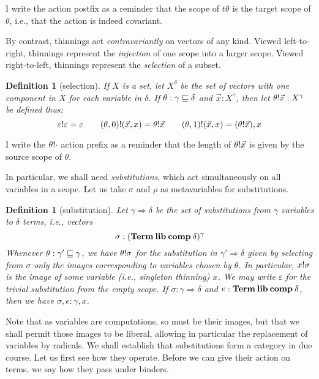 \documentclass{jfp1}
\newtheorem{definition}[theorem]{Definition}
\newcommand{\emp}{\varepsilon}
\begin{document}
I write the action postfix as a reminder that the scope of $t\theta$
is the target scope of $\theta$, i.e., that the action is indeed covariant.

By contrast, thinnings act \emph{contravariantly} on vectors of any kind.
Viewed left-to-right, thinnings represent the \emph{injection} of one scope
into a larger scope. Viewed right-to-left, thinnings represent the
\emph{selection} of a subset.

\begin{definition}[selection]
  If $X$ is a set, let $X^\delta$ be the set of vectors with one
  component in $X$ for each variable in $\delta$. If
  $\theta:\gamma\sqsubseteq\delta$ and $\vec x:X^\gamma$,
  then let $\theta!\vec x : X^\gamma$ be defined thus:
  \[
    \sel\emp\emp=\emp \qquad
    \sel{(\theta,0)}{(\vec x,x)} = \sel\theta{\vec x} \qquad
    \sel{(\theta,1)}{(\vec x,x)} = (\sel\theta{\vec x}),x
  \]
\end{definition}

I write the $\theta!\cdot$ action prefix as a reminder that the
length of $\theta!\vec x$ is given by the source scope
of $\theta$.

In particular, we shall need \emph{substitutions}, which act simultaneously on all variables
in a scope. Let us take $\sigma$ and $\rho$ as metavariables for substitutions.

\newcommand{\su}{\Rightarrow}
\begin{definition}[substitution]
  Let $\gamma\su\delta$ be the set of substitutions from $\gamma$ variables to $\delta$ terms,
  i.e., vectors \[\sigma : (\mathbf{Term}\:\textbf{lib}\:\textbf{comp}\:\delta)^\gamma\]
  Whenever $\theta : \gamma'\sqsubseteq\gamma$, we have $\theta!\sigma$
  for the substitution in $\gamma'\su\delta$ given by selecting from
  $\sigma$ only the images corresponding to variables chosen by
  $\theta$. In particular, $x!\sigma$ is the image of some variable
  (i.e., singleton thinning)
  $x$. 
  We may write $\emp$ for the trivial
  substitution from the empty scope. If $\sigma : \gamma \su \delta$
  and $e : \mathbf{Term}\:\textbf{lib}\:\textbf{comp}\:\delta$, then we have $\sigma,e : \gamma,x$.
\end{definition}

Note that as variables are computations, so must be their images, but that we shall permit
those images to be liberal, allowing in particular the replacement of variables by radicals.
We shall establish that substitutions form a category in due
course. Let us first see how they operate. Before we can give their action on terms, we say how they
pass under binders.
\end{document}
